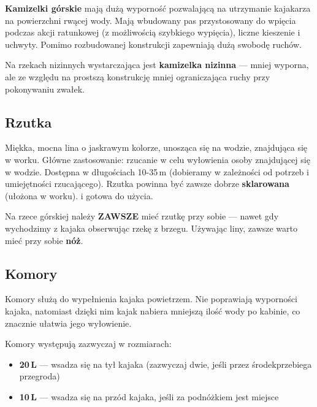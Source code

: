 \textbf{Kamizelki górskie} mają dużą wyporność pozwalającą na utrzymanie kajakarza na powierzchni rwącej wody. Mają wbudowany pas przystosowany do wpięcia podczas akcji ratunkowej (z możliwością szybkiego wypięcia), liczne kieszenie i uchwyty. Pomimo rozbudowanej konstrukcji zapewniają dużą swobodę ruchów.

Na rzekach nizinnych wystarczająca jest \textbf{kamizelka nizinna} — mniej wyporna, ale ze względu na prostszą konstrukcję mniej ograniczająca ruchy przy pokonywaniu zwałek.

\subsection{Rzutka}

Miękka, mocna lina o jaskrawym kolorze, unosząca się na wodzie, znajdująca się w worku. Główne zastosowanie: rzucanie w celu wyłowienia osoby znajdującej się w wodzie. Dostępna w długościach 10-35\,m (dobieramy w zależności od potrzeb i umiejętności rzucającego). Rzutka powinna być zawsze dobrze \textbf{sklarowana} (ułożona w worku).
i gotowa do użycia.

\begin{warnbox}
  Na rzece górskiej należy \textbf{ZAWSZE} mieć rzutkę przy sobie — nawet gdy wychodzimy z kajaka obserwując rzekę z brzegu. Używając liny, zawsze warto mieć przy sobie \textbf{nóż}.
\end{warnbox}

\subsection{Komory}

Komory służą do wypełnienia kajaka powietrzem. Nie poprawiają wyporności kajaka, natomiast dzięki nim kajak nabiera mniejszą ilość wody po kabinie, co znacznie ułatwia jego wyłowienie.

Komory występują zazwyczaj w rozmiarach:

\begin{itemize}[leftmargin=1.5em]
  \item \textbf{20\,L} — wsadza się na tył kajaka (zazwyczaj dwie, jeśli przez środekprzebiega przegroda)
  \item \textbf{10\,L} — wsadza się na przód kajaka, jeśli za podnóżkiem jest miejsce
\end{itemize}

